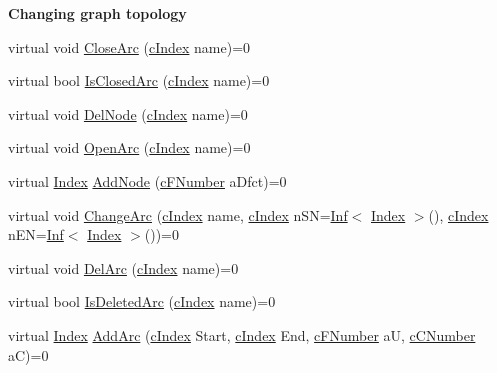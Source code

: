 \begin{Indent}\textbf{ Changing graph topology}\par
\begin{DoxyCompactItemize}
\item 
virtual void \mbox{\hyperlink{class_m_c_f_class_ae1c33ba491b57343fbc157123fff5b11}{Close\+Arc}} (\mbox{\hyperlink{class_m_c_f_class_a76aaabb20535c51a2752b93f6c38fe54}{c\+Index}} name)=0
\item 
virtual bool \mbox{\hyperlink{class_m_c_f_class_a2db08ae33bcdb997677a69f36c60c1e5}{Is\+Closed\+Arc}} (\mbox{\hyperlink{class_m_c_f_class_a76aaabb20535c51a2752b93f6c38fe54}{c\+Index}} name)=0
\item 
virtual void \mbox{\hyperlink{class_m_c_f_class_abecb8b32d512eea7daafba0e06ab4742}{Del\+Node}} (\mbox{\hyperlink{class_m_c_f_class_a76aaabb20535c51a2752b93f6c38fe54}{c\+Index}} name)=0
\item 
virtual void \mbox{\hyperlink{class_m_c_f_class_ab902a23d1c9520a22b79de5d451c3348}{Open\+Arc}} (\mbox{\hyperlink{class_m_c_f_class_a76aaabb20535c51a2752b93f6c38fe54}{c\+Index}} name)=0
\item 
virtual \mbox{\hyperlink{class_m_c_f_class_ad53d6229d7ec28555a9c9c2fd9abf773}{Index}} \mbox{\hyperlink{class_m_c_f_class_a6d58679267d8b620cc3337583dab4626}{Add\+Node}} (\mbox{\hyperlink{class_m_c_f_class_a11f747fbdff346237c8db4469d569994}{c\+F\+Number}} a\+Dfct)=0
\item 
virtual void \mbox{\hyperlink{class_m_c_f_class_aef2d28b0b0a2420d6b8b7093d827fa67}{Change\+Arc}} (\mbox{\hyperlink{class_m_c_f_class_a76aaabb20535c51a2752b93f6c38fe54}{c\+Index}} name, \mbox{\hyperlink{class_m_c_f_class_a76aaabb20535c51a2752b93f6c38fe54}{c\+Index}} n\+SN=\mbox{\hyperlink{class_o_p_ttypes__di__unipi__it_1_1_inf}{Inf}}$<$ \mbox{\hyperlink{class_m_c_f_class_ad53d6229d7ec28555a9c9c2fd9abf773}{Index}} $>$(), \mbox{\hyperlink{class_m_c_f_class_a76aaabb20535c51a2752b93f6c38fe54}{c\+Index}} n\+EN=\mbox{\hyperlink{class_o_p_ttypes__di__unipi__it_1_1_inf}{Inf}}$<$ \mbox{\hyperlink{class_m_c_f_class_ad53d6229d7ec28555a9c9c2fd9abf773}{Index}} $>$())=0
\item 
virtual void \mbox{\hyperlink{class_m_c_f_class_ae291d6625ff31a5fdcc1ef166e2dee34}{Del\+Arc}} (\mbox{\hyperlink{class_m_c_f_class_a76aaabb20535c51a2752b93f6c38fe54}{c\+Index}} name)=0
\item 
virtual bool \mbox{\hyperlink{class_m_c_f_class_a5f72b1b728182519a6a11accdfa78c7d}{Is\+Deleted\+Arc}} (\mbox{\hyperlink{class_m_c_f_class_a76aaabb20535c51a2752b93f6c38fe54}{c\+Index}} name)=0
\item 
virtual \mbox{\hyperlink{class_m_c_f_class_ad53d6229d7ec28555a9c9c2fd9abf773}{Index}} \mbox{\hyperlink{class_m_c_f_class_a564d624f62ccc0c130d733cc5470cb6d}{Add\+Arc}} (\mbox{\hyperlink{class_m_c_f_class_a76aaabb20535c51a2752b93f6c38fe54}{c\+Index}} Start, \mbox{\hyperlink{class_m_c_f_class_a76aaabb20535c51a2752b93f6c38fe54}{c\+Index}} End, \mbox{\hyperlink{class_m_c_f_class_a11f747fbdff346237c8db4469d569994}{c\+F\+Number}} aU, \mbox{\hyperlink{class_m_c_f_class_a07dbefeeb08c3f63073622411893eb76}{c\+C\+Number}} aC)=0
\end{DoxyCompactItemize}
\end{Indent}
